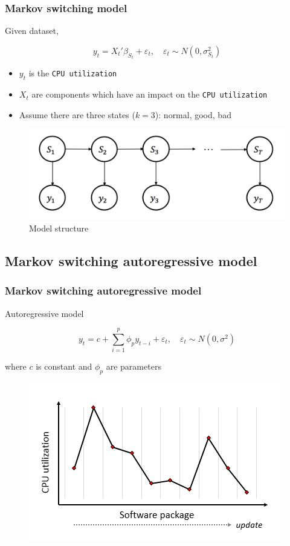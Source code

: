 \documentclass{beamer}
\begin{document}
\begin{frame}
\frametitle{Markov switching model}

Given dataset,

$$y_{t} = {X_{t}}'\beta_{S_{t}} + \varepsilon_{t}, \quad \varepsilon_{t} \sim N(0,\sigma^{2}_{S_{t}})$$

\begin{itemize}
	\item $y_{t}$ is the \texttt{CPU utilization}
	\item$X_{t}$ are components which have an impact on the \texttt{CPU utilization}
	\item Assume there are three states ($k=3$): normal, good, bad
\end{itemize}

\begin{figure}
	\includegraphics[width=0.5\linewidth]{msm}
	\caption{Model structure}
\end{figure}

\end{frame}

\subsection{Markov switching autoregressive model} %

\begin{frame}
\frametitle{Markov switching autoregressive model}

Autoregressive model

$$y_{t} = c + \sum_{i=1}^{p}\phi_{p}y_{t-i} + \varepsilon_{t}, \quad \varepsilon_{t} \sim N(0,\sigma^{2})$$

where $c$ is constant and $\phi_{p}$ are parameters

\begin{figure}
	\includegraphics[width=0.6\linewidth]{inde}
\end{figure}
\end{frame}
\end{document}
